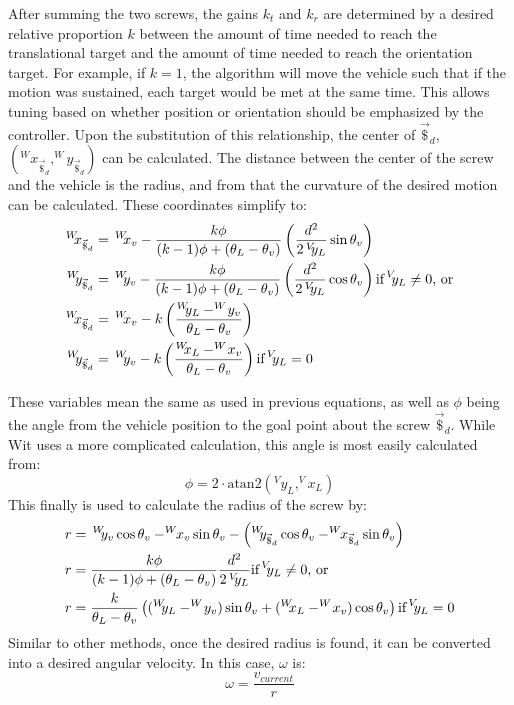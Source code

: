 \documentclass[mla8alt]{mla}
\begin{document}
\begin{paper}
After summing the two screws, the gains $k_t$ and $k_r$ are determined by a desired relative proportion $k$ between the amount of time needed to reach the translational target and the amount of time needed to reach the orientation target. For example, if $k=1$, the algorithm will move the vehicle such that if the motion was sustained, each target would be met at the same time. This allows tuning based on whether position or orientation should be emphasized by the controller. Upon the substitution of this relationship, the center of $\vec{\$}_d$, $(^W\!\!x_{\vec{\$}_d}, ^W\!\!y_{\vec{\$}_d})$ can be calculated. The distance between the center of the screw and the vehicle is the radius, and from that the curvature of the desired motion can be calculated. These coordinates simplify to:
\begin{subequations}
\begin{align}
^W\!\!x_{\vec{\$}_d} &=\,^W\!\!x_v - \frac{k\phi}{(k-1)\phi+(\theta_L-\theta_v)} \left( \frac{d^2}{2\,^V\!\!y_L}\sin{\theta_v} \right)\\
^W\!\!y_{\vec{\$}_d} &=\,^W\!\!y_v - \frac{k\phi}{(k-1)\phi+(\theta_L-\theta_v)} \left( \frac{d^2}{2\,^V\!\!y_L}\cos{\theta_v} \right)
\text{if\,}^V\!\!y_L\neq0 \text{, or}\\
^W\!\!x_{\vec{\$}_d} &=\,^W\!\!x_v - k \left( \frac{^W\!\!y_L-^W\!y_v}{\theta_L-\theta_v} \right) \\
^W\!\!y_{\vec{\$}_d} &=\,^W\!\!y_v - k \left( \frac{^W\!\!x_L-^W\!x_v}{\theta_L-\theta_v} \right) 
\text{if\,} ^V\!\!y_L=0
\end{align}
\end{subequations}

These variables mean the same as used in previous equations, as well as $\phi$ being the angle from the vehicle position to the goal point about the screw $\vec{\$}_d$. While Wit uses a more complicated calculation, this angle is most easily calculated from:
\begin{equation}
\phi=2 \cdot \text{atan2}\left(^V\!\!y_L, ^V\!\!x_L\right)
\end{equation}
This finally is used to calculate the radius of the screw by:
\begin{subequations}
\begin{align}
r&= \,^W\!\!y_v\cos{\theta_v}-^W\!\!x_v\sin{\theta_v}-\left(^W\!\!y_{\vec{\$}_d}\cos{\theta_v}-^W\!\!x_{\vec{\$}_d}\sin{\theta_v}\right) \\
r&= \frac{k\phi}{(k-1)\phi+(\theta_L-\theta_v)} \frac{d^2}{2\,^V\!\!y_L} \label{eqn:vp1}
\text{if\,}^V\!\!y_L\neq0 \text{, or}\\
r&= \frac{k}{\theta_L-\theta_v} \left((^W\!\!y_L-^W\!y_v)\sin{\theta_v}+(^W\!\!x_L-^W\!x_v)\cos{\theta_v}\right)
\text{if\,} ^V\!\!y_L=0
\end{align}
\end{subequations}
Similar to other methods, once the desired radius is found, it can be converted into a desired angular velocity. In this case, $\omega$ is:
\begin{equation}
\omega=\frac{v_{current}}{r}
\end{equation}


\end{paper}
\end{document}
